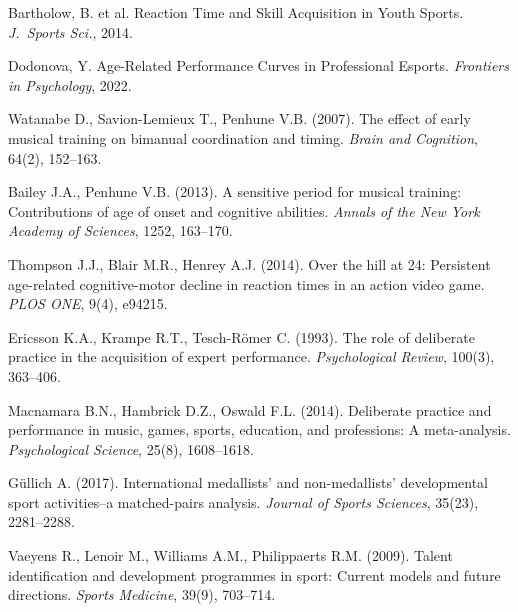 \documentclass[12pt]{article}
\begin{document}
	
	
	\begin{thebibliography}{9}
		Bartholow, B. et al. Reaction Time and Skill Acquisition in Youth Sports. \emph{J.~Sports Sci.}, 2014.
		
		Dodonova, Y. Age-Related Performance Curves in Professional Esports. \emph{Frontiers in Psychology}, 2022.
		
		Watanabe D., Savion-Lemieux T., Penhune V.\hspace{0pt}B. (2007).
		The effect of early musical training on bimanual coordination and timing.
		\emph{Brain and Cognition}, 64(2), 152–163.
		
		Bailey J.\hspace{0pt}A., Penhune V.\hspace{0pt}B. (2013).
		A sensitive period for musical training: Contributions of age of onset and cognitive abilities.
		\emph{Annals of the New York Academy of Sciences}, 1252, 163–170.
		
		Thompson J.\hspace{0pt}J., Blair M.\hspace{0pt}R., Henrey A.\hspace{0pt}J. (2014).
		Over the hill at 24: Persistent age-related cognitive-motor decline in reaction times in an action video game.
		\emph{PLOS ONE}, 9(4), e94215.
		
		Ericsson K.\hspace{0pt}A., Krampe R.\hspace{0pt}T., Tesch-R{\"o}mer C. (1993).
		The role of deliberate practice in the acquisition of expert performance.
		\emph{Psychological Review}, 100(3), 363–406.
		
		Macnamara B.\hspace{0pt}N., Hambrick D.\hspace{0pt}Z., Oswald F.\hspace{0pt}L. (2014).
		Deliberate practice and performance in music, games, sports, education, and professions: A meta-analysis.
		\emph{Psychological Science}, 25(8), 1608–1618.
		
		G{\"u}llich A. (2017).
		International medallists’ and non-medallists’ developmental sport activities–a matched-pairs analysis.
		\emph{Journal of Sports Sciences}, 35(23), 2281–2288.
		
		Vaeyens R., Lenoir M., Williams A.\hspace{0pt}M., Philippaerts R.\hspace{0pt}M. (2009).
		Talent identification and development programmes in sport: Current models and future directions.
		\emph{Sports Medicine}, 39(9), 703–714.
	\end{thebibliography}
	
\end{document}
